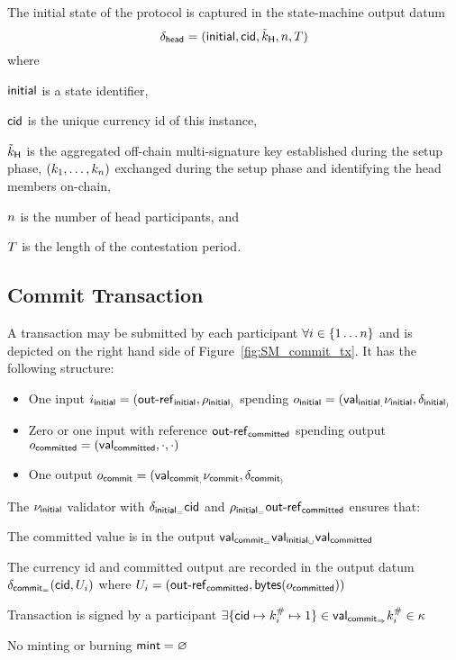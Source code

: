 \noindent The initial state of the protocol is captured in the state-machine output datum
\[
  \delta_{\mathsf{head}} = (\mathsf{initial},\mathsf{cid},\tilde{k}_{\mathsf{H}},n,T)
\]
where
\begin{mitemize}
  \item $\mathsf{initial}$ is a state identifier,
  \item $\mathsf{cid}$ is the unique currency id of this instance,
  \item $\tilde{k}_{\mathsf{H}}$ is the aggregated off-chain multi-signature key established during the
  setup phase,
  $(k_1,\ldots,k_n)$ exchanged during the setup phase and identifying the
  head members on-chain,
  \item $n$ is the number of head participants, and
  \item $T$ is the length of the contestation period.
\end{mitemize}



\subsection{Commit Transaction}\label{sec:commit-tx}

A \mtxCom{} transaction may be submitted by each participant
$\forall i \in \{1 \dots n\}$ and is depicted on the right hand side of
Figure~\ref{fig:SM_commit_tx}. It has the following structure:
\begin{itemize}
  \item One input $i_{\mathsf{initial}} = (\mathsf{out\textsf{-}{}ref}_{\mathsf{initial}}, \rho_{\mathsf{initial}_{)}}$
        spending $o_{\mathsf{initial}} = (\mathsf{val}_{\mathsf{initial}_{,}} \nu_{\mathsf{initial}}, \delta_{\mathsf{initial}_{)}}$
  \item Zero or one input with reference
        $\mathsf{out\textsf{-}{}ref}_{\mathsf{committed}}$ spending output
        $o_{\mathsf{committed}} = (\mathsf{val}_{\mathsf{committed}}, \cdot , \cdot)$
  \item One output $o_{\mathsf{commit}} = (\mathsf{val}_{\mathsf{commit}_{,}} \nu_{\mathsf{commit}}, \delta_{\mathsf{commit}_{)}}$
\end{itemize}

\noindent The $\nu_{\mathsf{initial}}$ validator with $\delta_{\mathsf{initial}_{=}} \mathsf{cid}$ and $\rho_{\mathsf{initial}_{=}} \mathsf{out\textsf{-}{}ref}_{\mathsf{committed}}$ ensures that:
\begin{menumerate}
  \item The committed value is in the output $\mathsf{val}_{\mathsf{commit}_{=}} \mathsf{val}_{\mathsf{initial}_{\cup}} \mathsf{val}_{\mathsf{committed}}$
  \item The currency id and committed output are recorded in the output datum
  $\delta_{\mathsf{commit}_{=}} (\mathsf{cid}, U_{i})$ where
  $U_{i} = (\mathsf{out\textsf{-}{}ref}_{\mathsf{committed}},\mathsf{bytes}(o_{\mathsf{committed}}))$
  \item Transaction is signed by a participant $\exists \{\mathsf{cid} \mapsto k^{\#}_{i} \mapsto 1\} \in \mathsf{val}_{\mathsf{commit}_{\Rightarrow}} k^{\#}_{i} \in \kappa$
  \item No minting or burning  $\mathsf{mint} = \varnothing$
\end{menumerate}

